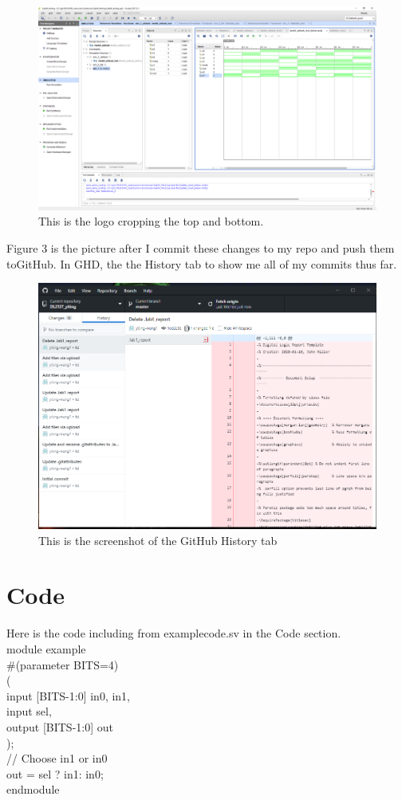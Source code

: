 \documentclass[11pt]{article}
\begin{document}
	\begin{figure}[ht]\centering
		\includegraphics[width=1.0\textwidth,trim=8cm 8cm 0cm 0cm,clip]{Lab1Table}
		\caption{This is the logo cropping the top and bottom.}
		\label{fig:another_image}
	\end{figure}

	Figure 3 is the picture after I commit these changes to my repo and push them toGitHub. In GHD, the the History tab to show me all of my commits thus far.\\
	\begin{figure}[ht]\centering
		\includegraphics[width=1.0\textwidth]{GitHub}
		\caption{This is the screenshot of the GitHub History tab}
		\label{fig:GitHub}
	\end{figure}



\section*{Code}
	Here is the code including from examplecode.sv in the Code section.\\
	module example \\
	\#(parameter BITS=4) \\
	(\\
	input [BITS-1:0] in0, in1,\\
	input sel,\\
	output [BITS-1:0] out\\
	);\\
	
	// Choose in1 or in0\\
	out = sel ? in1: in0; \\
	endmodule
\end{document}
